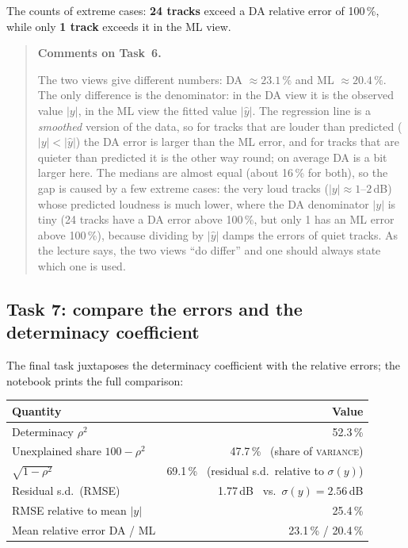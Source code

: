 \documentclass[11pt,letterpaper]{article}
\newenvironment{taskcomments}[1][Comments]{%
  \par\medskip\noindent
  \begin{quote}\small\textbf{#1.}\enspace\ignorespaces
}{%
  \end{quote}\medskip
}
\begin{document}
The counts of extreme cases: \textbf{24 tracks} exceed a DA relative error of
100\,\%, while only \textbf{1 track} exceeds it in the ML view.

\begin{taskcomments}[Comments on Task~6]
The two views give different numbers: DA $\approx 23.1\,\%$ and ML $\approx
20.4\,\%$. The only difference is the denominator: in the DA view it is the
observed value $|y|$, in the ML view the fitted value $|\hat y|$. The
regression line is a \emph{smoothed} version of the data, so for tracks that
are louder than predicted ($|y|<|\hat y|$) the DA error is larger than the ML
error, and for tracks that are quieter than predicted it is the other way
round; on average DA is a bit larger here. The medians are almost equal
(about 16\,\% for both), so the gap is caused by a few extreme cases: the
very loud tracks ($|y| \approx 1$--$2$\,dB) whose predicted loudness is much
lower, where the DA denominator $|y|$ is tiny (24 tracks have a DA error
above 100\,\%, but only 1 has an ML error above 100\,\%), because dividing by
$|\hat{y}|$ damps the errors of quiet tracks. As the lecture says, the two
views ``do differ'' and one should always state which one is used.
\end{taskcomments}

\subsection{Task 7: compare the errors and the determinacy coefficient}\label{sec:a1t7}

The final task juxtaposes the determinacy coefficient with the relative
errors; the notebook prints the full comparison:
\begin{center}
\small
\begin{tabular}{lr}
\toprule
Quantity & Value \\
\midrule
Determinacy $\rho^2$ & 52.3\,\% \\
Unexplained share $100-\rho^2$ & 47.7\,\% \ (share of \textsc{variance}) \\
$\sqrt{1-\rho^2}$ & 69.1\,\% \ (residual s.d.\ relative to $\sigma(y)$) \\
Residual s.d.\ (RMSE) & 1.77\,dB \ vs.\ $\sigma(y) = 2.56$\,dB \\
RMSE relative to mean $|y|$ & 25.4\,\% \\
Mean relative error DA / ML & 23.1\,\% / 20.4\,\% \\
\bottomrule
\end{tabular}
\end{center}
\end{document}
